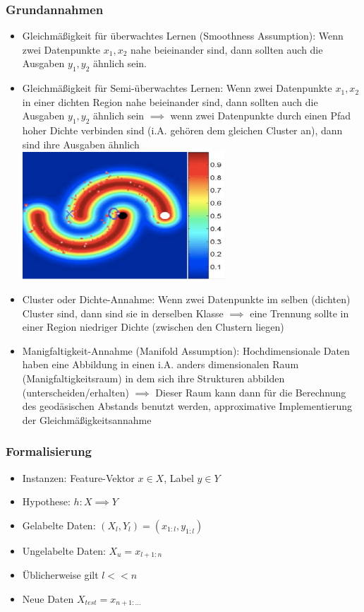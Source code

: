 \documentclass[paper=a4, fontsize=11pt]{scrartcl} %
\numberwithin{equation}{section} %
\numberwithin{figure}{section} %
\numberwithin{table}{section} %
\begin{document}
\subsubsection{Grundannahmen}

\begin{itemize}
\item Gleichmäßigkeit für überwachtes Lernen (Smoothness Assumption): Wenn zwei Datenpunkte $x_1, x_2$ nahe beieinander sind, dann sollten auch die Ausgaben $y_1, y_2$ ähnlich sein.
\item Gleichmäßigkeit für Semi-überwachtes Lernen: Wenn zwei Datenpunkte $x_1, x_2$ in einer dichten Region nahe beieinander sind, dann sollten auch die Ausgaben $y_1, y_2$ ähnlich sein $\implies$ wenn zwei Datenpunkte durch einen Pfad hoher Dichte verbinden sind (i.A. gehören dem gleichen Cluster an), dann sind ihre Ausgaben ähnlich\\
\includegraphics[width=0.6\textwidth]{imgs/density}
\item Cluster oder Dichte-Annahme: Wenn zwei Datenpunkte im selben (dichten) Cluster sind, dann sind sie in derselben Klasse $\implies$ eine Trennung sollte in einer Region niedriger Dichte (zwischen den Clustern liegen)
\item Manigfaltigkeit-Annahme (Manifold Assumption): Hochdimensionale Daten haben eine Abbildung in einen i.A. anders dimensionalen Raum (Manigfaltigkeitsraum) in dem sich ihre Strukturen abbilden (unterscheiden/erhalten) $\implies$ Dieser Raum kann dann für die Berechnung des geodäsischen Abstands benutzt werden, approximative Implementierung der Gleichmäßigkeitsannahme
\end{itemize}

\subsubsection{Formalisierung}

\begin{itemize}
\item Instanzen: Feature-Vektor $x \in X$, Label $y \in Y$
\item Hypothese: $h: X \implies Y$
\item Gelabelte Daten: $(X_l, Y_l) = {(x_{1:l}, y_{1:l})}$
\item Ungelabelte Daten: $X_u = {x_{l+1:n}}$
\item Üblicherweise gilt $l << n$
\item Neue Daten $X_{test} = {x_{n+1:...}}$
\end{itemize}
\end{document}

